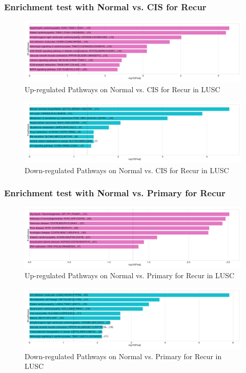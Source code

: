 \documentclass{beamer}
\begin{document}
    \begin{frame}
        \frametitle{Enrichment test with Normal vs. CIS for Recur}

        \begin{figure}
            \includegraphics[width=0.8 \linewidth]{figures/DEG/Enrichment/STAR.SQC.Recur.Normal-CIS.Up.KEGG.pdf}
            \caption{Up-regulated Pathways on Normal vs. CIS for Recur in LUSC}
        \end{figure}

        \begin{figure}
            \includegraphics[width=0.8 \linewidth]{figures/DEG/Enrichment/STAR.SQC.Recur.Normal-CIS.Down.KEGG.pdf}
            \caption{Down-regulated Pathways on Normal vs. CIS for Recur in LUSC}
        \end{figure}
    \end{frame}

    \begin{frame}
        \frametitle{Enrichment test with Normal vs. Primary for Recur}

        \begin{figure}
            \includegraphics[width=0.8 \linewidth]{figures/DEG/Enrichment/STAR.SQC.Recur.Normal-Primary.Up.KEGG.pdf}
            \caption{Up-regulated Pathways on Normal vs. Primary for Recur in LUSC}
        \end{figure}

        \begin{figure}
            \includegraphics[width=0.8 \linewidth]{figures/DEG/Enrichment/STAR.SQC.Recur.Normal-Primary.Down.KEGG.pdf}
            \caption{Down-regulated Pathways on Normal vs. Primary for Recur in LUSC}
        \end{figure}
    \end{frame}
\end{document}
